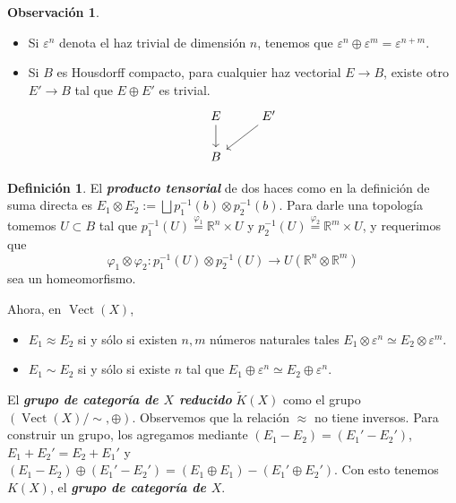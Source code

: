 \documentclass[spanish]{book}
\theoremstyle{definition}
\newtheorem*{defn}{Definición}
\newtheorem*{obs}{Observación}
\newcommand{\R}{\mathbb{R}}
\begin{document}
\begin{obs}\leavevmode
	\begin{itemize}
		\item Si $\varepsilon^n$ denota el haz trivial de dimensión $n$, tenemos que $\varepsilon^n\oplus \varepsilon^m=\varepsilon^{n+m}$.
		
		\item Si $B$ es Housdorff compacto, para cualquier haz vectorial $E\to B$, existe otro $E'\to B$ tal que $E\oplus E'$ es trivial.
		\[\begin{tikzcd}
			E\arrow[d]&E'\arrow[ld]\\
			B
		\end{tikzcd}\]
	\end{itemize}
\end{obs}

\begin{defn}
	El \textbf{\textit{producto tensorial}} de dos haces como en la definición de suma directa es $E_1\otimes E_2:=\bigsqcup p_1^{-1}(b)\otimes p_2^{-1}(b)$. Para darle una topología tomemos $U\subset B$ tal que $p^{-1}_1(U)\overset{\varphi_1}{=}\R^n\times U$ y $p^{-1}_2(U)\overset{\varphi_2}{=}\R^m\times U$, y requerimos que
	\[\varphi_1\otimes\varphi_2:p^{-1}_1(U)\otimes p_2^{-1}(U)\to U(\R^n\otimes\R^m)\]
	sea un homeomorfismo.
\end{defn}

Ahora, en $\operatorname{Vect}(X)$,
\begin{itemize}
	\item $E_1\approx E_2$ si y sólo si existen $n,m$ números naturales tales $E_1\otimes\varepsilon^n\simeq E_2\otimes\varepsilon^m$.
	
	\item $E_1\sim E_2$ si y sólo si existe $n$ tal que $E_1\oplus \varepsilon^n\simeq E_2\oplus \varepsilon^n$.
\end{itemize}


	El \textbf{\textit{grupo de categoría de $X$ reducido}} $\tilde{K}(X)$ como el grupo $(\operatorname{Vect}(X)/\sim ,\oplus)$. Observemos que la relación $\approx$ no tiene inversos. Para construir un grupo, los agregamos mediante $(E_1-E_2)=(E_1'-E_2')$, $E_1+E_2'=E_2+E_1'$ y $(E_1-E_2)\oplus(E_1'-E_2')=(E_1\oplus E_1)-(E_1'\oplus E_2')$. Con esto tenemos $K(X)$, el \textbf{\textit{grupo de categoría de $X$}}.
	
\end{document}
